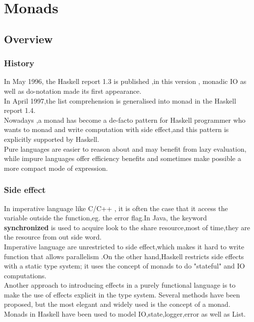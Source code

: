 \chapter{Monads}
\section{Overview}


\subsection{History}
In May 1996, the Haskell report 1.3 is published ,in this version , monadic IO as well as do-notation made its first appearance.\cite{history} \\

In April 1997,the list comprehension is generalised into monad in the Haskell report 1.4.\cite{history} \\ 

Nowadays ,a monad has become a de-facto pattern for Haskell programmer who wants to monad and write computation with side effect,and this pattern is explicitly supported by Haskell.\\


Pure languages are easier to reason about and may benefit from lazy
evaluation, while impure languages offer efficiency benefits and sometimes make possible a more compact mode of expression.\cite{monads_for}



\subsection{Side effect}
In imperative language like C/C++ , it is often the case that it access the variable outside the function,eg. the error flag.In Java, the keyword \textbf{synchronized} is used to acquire look to the share resource,most of time,they are the resource from out side word.\\

Imperative language are unrestricted to side effect,which makes it hard to write function that allows parallelism .On the other hand,Haskell restricts side effects with a static type system; it uses the concept of monads to do "stateful" and IO computations.\cite{imperative} \\

Another approach to introducing effects in a purely functional language
is to make the use of effects explicit in the type system. Several methods
have been proposed, but the most elegant and widely used is the concept
of a monad.\cite{imperative}  Monads in Haskell have been used to model IO,state,logger,error as well as List.



